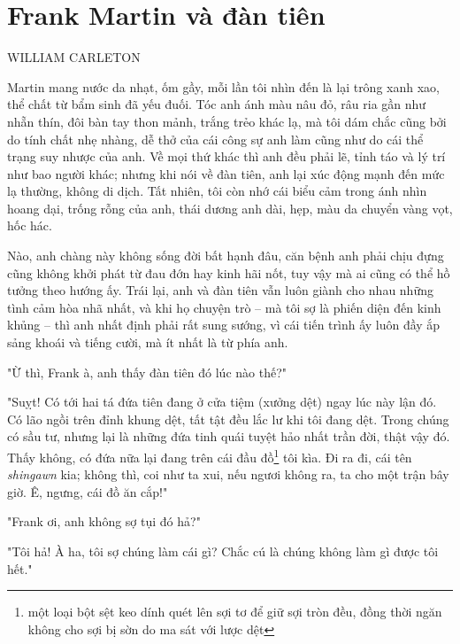 \section{Frank Martin và đàn tiên}

\begin{large}
  \begin{center}
    \uppercase{William Carleton}
  \end{center}
\end{large}

Martin mang nước da nhạt, ốm gầy, mỗi lần tôi nhìn đến là lại trông xanh xao, thể chất từ bẩm sinh đã yếu đuối. Tóc anh ánh màu nâu đỏ, râu ria gần như nhẵn thín, đôi bàn tay thon mảnh, trắng trẻo khác lạ, mà tôi dám chắc cũng bởi do tính chất nhẹ nhàng, dễ thở của cái công sự anh làm cũng như do cái thể trạng suy nhược của anh. Về mọi thứ khác thì anh đều phải lẽ, tỉnh táo và lý trí như bao người khác; nhưng khi nói về đàn tiên, anh lại xúc động mạnh đến mức lạ thường, không di dịch. Tất nhiên, tôi còn nhớ cái biểu cảm trong ánh nhìn hoang dại, trống rỗng của anh, thái dương anh dài, hẹp, màu da chuyển vàng vọt, hốc hác.\par

Nào, anh chàng này không sống đời bất hạnh đâu, căn bệnh anh phải chịu đựng cũng không khởi phát từ đau đớn hay kinh hãi nốt, tuy vậy mà ai cũng có thể hồ tưởng theo hướng ấy. Trái lại, anh và đàn tiên vẫn luôn giành cho nhau những tình cảm hòa nhã nhất, và khi họ chuyện trò – mà tôi sợ là phiến diện đến kinh khủng – thì anh nhất định phải rất sung sướng, vì cái tiến trình ấy luôn đầy ắp sảng khoái và tiếng cười, mà ít nhất là từ phía anh.

"Ừ thì, Frank à, anh thấy đàn tiên đó lúc nào thế?"

"Suỵt! Có tới hai tá đứa tiên đang ở cửa tiệm (xưởng dệt) ngay lúc này lận đó. Có lão ngồi trên đỉnh khung dệt, tất tật đều lắc lư khi tôi đang dệt. Trong chúng có sầu tư, nhưng lại là những đứa tinh quái tuyệt hảo nhất trần đời, thật vậy đó. Thấy không, có đứa nữa lại đang trên cái đầu đồ\footnote{một loại bột sệt keo dính quét lên sợi tơ để giữ sợi tròn đều, đồng thời ngăn không cho sợi bị sờn do ma sát với lược dệt} tôi kìa. Đi ra đi, cái tên \textit{shingawn} kia; không thì, coi như ta xui, nếu ngươi không ra, ta cho một trận bây giờ. Ê, ngưng, cái đồ ăn cắp!"

"Frank ơi, anh không sợ tụi đó hả?"

"Tôi hả! À ha, tôi sợ chúng làm cái gì? Chắc cú là chúng không làm gì được tôi hết."

